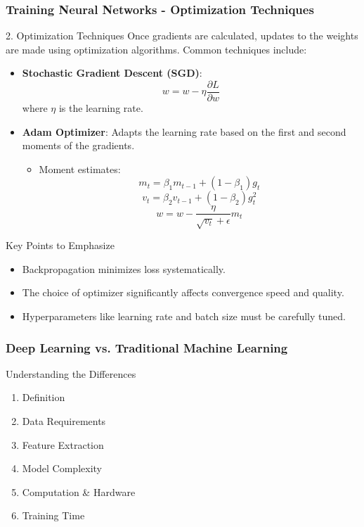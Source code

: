 \documentclass[aspectratio=169]{beamer}
\begin{document}
\begin{frame}[fragile]
    \frametitle{Training Neural Networks - Optimization Techniques}
    \begin{block}{2. Optimization Techniques}
        Once gradients are calculated, updates to the weights are made using optimization algorithms. Common techniques include:
        \begin{itemize}
            \item \textbf{Stochastic Gradient Descent (SGD)}: 
            \[
            w = w - \eta \frac{\partial L}{\partial w}
            \]
            where \( \eta \) is the learning rate.
            
            \item \textbf{Adam Optimizer}: Adapts the learning rate based on the first and second moments of the gradients.
            \begin{itemize}
                \item Moment estimates:
                \[
                m_t = \beta_1 m_{t-1} + (1 - \beta_1)g_t
                \]
                \[
                v_t = \beta_2 v_{t-1} + (1 - \beta_2)g_t^2
                \]
                \[
                w = w - \frac{\eta}{\sqrt{v_t} + \epsilon} m_t
                \]
            \end{itemize}
        \end{itemize}
    \end{block}
    \begin{block}{Key Points to Emphasize}
        \begin{itemize}
            \item Backpropagation minimizes loss systematically.
            \item The choice of optimizer significantly affects convergence speed and quality.
            \item Hyperparameters like learning rate and batch size must be carefully tuned.
        \end{itemize}
    \end{block}
\end{frame}

\begin{frame}[fragile]
    \frametitle{Deep Learning vs. Traditional Machine Learning}
    \begin{block}{Understanding the Differences}
        \begin{enumerate}
            \item Definition
            \item Data Requirements
            \item Feature Extraction
            \item Model Complexity
            \item Computation \& Hardware
            \item Training Time
        \end{enumerate}
    \end{block}
\end{frame}
\end{document}
